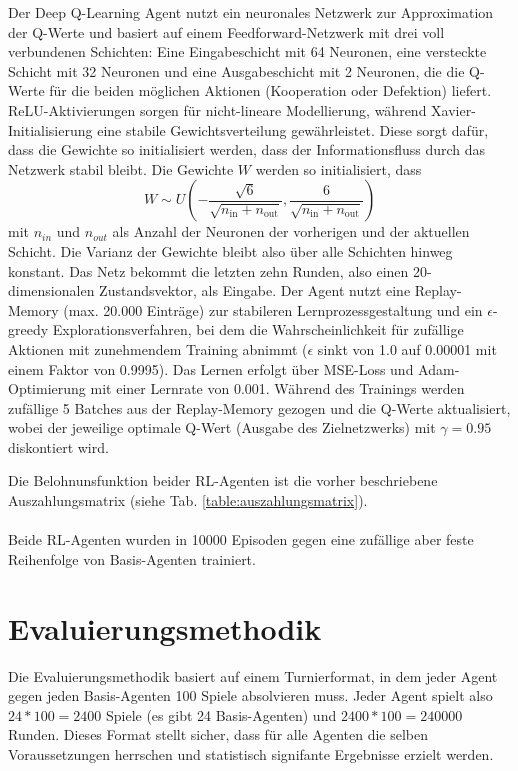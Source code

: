 Der Deep Q-Learning Agent nutzt ein neuronales Netzwerk zur Approximation der Q-Werte und basiert auf einem 
Feedforward-Netzwerk mit drei voll verbundenen Schichten: Eine Eingabeschicht mit 64 Neuronen, eine versteckte 
Schicht mit 32 Neuronen und eine Ausgabeschicht mit 2 Neuronen, die die Q-Werte für die beiden möglichen Aktionen 
(Kooperation oder Defektion) liefert. ReLU-Aktivierungen sorgen für nicht-lineare Modellierung, während Xavier-Initialisierung 
eine stabile Gewichtsverteilung gewährleistet. Diese sorgt dafür, dass die Gewichte so initialisiert werden, dass der 
Informationsfluss durch das Netzwerk stabil bleibt. Die Gewichte $W$ werden so initialisiert, dass
\begin{equation}
    W \sim U \left( -\frac{\sqrt{6}}{\sqrt{n_{\text{in}}+n_{\text{out}}}}, \frac{6}{\sqrt{n_{\text{in}}+n_{\text{out}}}} \right)
\end{equation}
mit $n_{in}$ und $n_{out}$ als Anzahl der Neuronen der vorherigen und der aktuellen Schicht. Die Varianz der Gewichte bleibt
also über alle Schichten hinweg konstant.
Das Netz bekommt die letzten zehn Runden, also einen 20-dimensionalen 
Zustandsvektor, als Eingabe. Der Agent nutzt eine Replay-Memory (max. 20.000 Einträge) zur stabileren 
Lernprozessgestaltung und ein $\epsilon$-greedy Explorationsverfahren, bei dem die Wahrscheinlichkeit für zufällige Aktionen mit 
zunehmendem Training abnimmt ($\epsilon$ sinkt von 1.0 auf 0.00001 mit einem Faktor von 0.9995). Das Lernen erfolgt über MSE-Loss und Adam-Optimierung mit 
einer Lernrate von 0.001.
Während des Trainings werden zufällige 5 Batches aus der Replay-Memory gezogen und die Q-Werte 
aktualisiert, wobei der jeweilige optimale Q-Wert (Ausgabe des Zielnetzwerks) mit $\gamma=0.95$ diskontiert wird.

Die Belohnunsfunktion beider RL-Agenten ist die vorher beschriebene Auszahlungsmatrix (siehe Tab. \ref{table:auszahlungsmatrix}). \\ \\
Beide RL-Agenten wurden in 10000 Episoden gegen eine zufällige aber feste Reihenfolge von Basis-Agenten trainiert.


\section{Evaluierungsmethodik}
Die Evaluierungsmethodik basiert auf einem Turnierformat, in dem jeder Agent gegen jeden Basis-Agenten 100 Spiele 
absolvieren muss. Jeder Agent spielt also $24 * 100 = 2400$ Spiele (es gibt 24 Basis-Agenten) und $2400 * 100 = 240000$ Runden. Dieses Format
stellt sicher, dass für alle Agenten die selben Voraussetzungen herrschen und statistisch signifante Ergebnisse erzielt werden.
